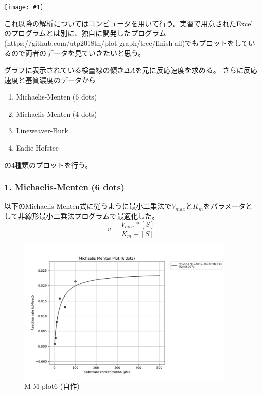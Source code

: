 \documentclass[a4paper,papersize,dvipdfmx]{jsarticle}
\newcommand{\pict}[2]{\begin{center} \texttt{[image: \#1]} \end{center}}   %
\begin{document}
\pict{imgs/Absorbance.png}{12}


これ以降の解析についてはコンピュータを用いて行う。実習で用意されたExcelのプログラムとは別に、独自に開発したプログラム(https://github.com/utp2018th/plot-graph/tree/finish-all)でもプロットをしているので両者のデータを見ていきたいと思う。

グラフに表示されている検量線の傾き$\Delta A$を元に反応速度を求める。
さらに反応速度と基質濃度のデータから

\begin{enumerate}
\item Michaelis-Menten (6 dots)
\item Michaelis-Menten (4 dots)
\item Lineweaver-Burk
\item Eadie-Hofstee
\end{enumerate}

の4種類のプロットを行う。

\newpage

\subsubsection*{1. Michaelis-Menten (6 dots)}
以下のMichaelis-Menten式に従うように最小二乗法で$V_{max}$と$K_m$をパラメータとして非線形最小二乗法プログラムで最適化した。
\[v=\frac{V_{max} *[S] }{K_m + [S]}\]

\begin{figure}[H]
\begin{center}
\includegraphics[clip, height=7cm]{imgs/MichaelisMenten6.png}
\caption{M-M plot6 (自作)}
\end{center}
\end{figure}
\end{document}
